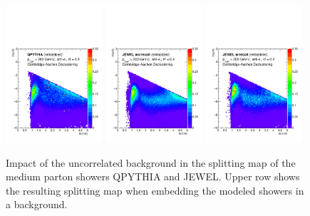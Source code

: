 \begin{figure}
\centering
\includegraphics[width=0.32\textwidth]
{figures/LundMC/FinalPlots/QPythia_Emb.pdf}
\includegraphics[width=0.32\textwidth]
{figures/LundMC/FinalPlots/Jewel_MedEmb_RecoilOff.pdf}
\includegraphics[width=0.32\textwidth]
{figures/LundMC/FinalPlots/Jewel_MedEmb_RecoilOn.pdf}\\
\caption{Impact of the uncorrelated background in the splitting map of the medium parton showers QPYTHIA and JEWEL. Upper row shows the resulting splitting map when embedding the modeled showers in a background. 
}
\label{fig:UncorrelatedBkgSignal}
\end{figure}
